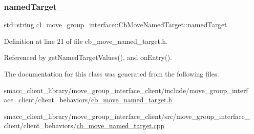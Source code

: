 \subsubsection{\texorpdfstring{named\+Target\+\_\+}{namedTarget\_}}
{\footnotesize\ttfamily std\+::string cl\+\_\+move\+\_\+group\+\_\+interface\+::\+Cb\+Move\+Named\+Target\+::named\+Target\+\_\+\hspace{0.3cm}{\ttfamily [protected]}}



Definition at line 21 of file cb\+\_\+move\+\_\+named\+\_\+target.\+h.



Referenced by get\+Named\+Target\+Values(), and on\+Entry().



The documentation for this class was generated from the following files\+:\begin{DoxyCompactItemize}
\item 
smacc\+\_\+client\+\_\+library/move\+\_\+group\+\_\+interface\+\_\+client/include/move\+\_\+group\+\_\+interface\+\_\+client/client\+\_\+behaviors/\hyperlink{cb__move__named__target_8h}{cb\+\_\+move\+\_\+named\+\_\+target.\+h}\item 
smacc\+\_\+client\+\_\+library/move\+\_\+group\+\_\+interface\+\_\+client/src/move\+\_\+group\+\_\+interface\+\_\+client/client\+\_\+behaviors/\hyperlink{cb__move__named__target_8cpp}{cb\+\_\+move\+\_\+named\+\_\+target.\+cpp}\end{DoxyCompactItemize}
